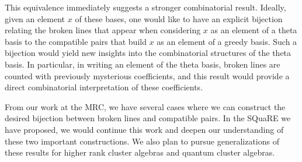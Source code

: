 \documentclass{amsart}
\begin{document}
    This equivalence immediately suggests a stronger combinatorial result.
    Ideally, given an element $x$ of these bases, one would like to have an
    explicit bijection relating the broken lines that appear when considering
    $x$ as an element of a theta basis to the compatible pairs that build $x$ as
    an element of a greedy basis.
    Such a bijection would yield new insights into the combinatorial structures
    of the theta basis.
    In particular, in writing an element of the theta basis, broken lines are
    counted with previously mysterious coefficients, and this result would
    provide a direct combinatorial interpretation of these coefficients.
    
    From our work at the MRC, we have several cases where we can construct the
    desired bijection between broken lines and compatible pairs.
    In the SQuaRE we have proposed, we would continue this work and deepen our
    understanding of these two important constructions.
    We also plan to pursue generalizations of these results for higher rank cluster algebras and
    quantum cluster algebras.
\end{document}
